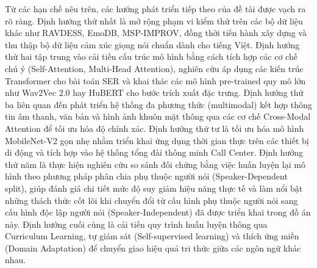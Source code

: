 Từ các hạn chế nêu trên, các hướng phát triển tiếp theo của đề tài được vạch ra rõ ràng. Định hướng thứ nhất là mở rộng phạm vi kiểm thử trên các bộ dữ liệu khác như RAVDESS, EmoDB, MSP-IMPROV, đồng thời tiến hành xây dựng và thu thập bộ dữ liệu cảm xúc giọng nói chuẩn dành cho tiếng Việt. Định hướng thứ hai tập trung vào cải tiến cấu trúc mô hình bằng cách tích hợp các cơ chế chú ý (Self-Attention, Multi-Head Attention), nghiên cứu áp dụng các kiến trúc Transformer cho bài toán SER và khai thác các mô hình pre-trained quy mô lớn như Wav2Vec 2.0 hay HuBERT cho bước trích xuất đặc trưng. Định hướng thứ ba liên quan đến phát triển hệ thống đa phương thức (multimodal) kết hợp thông tin âm thanh, văn bản và hình ảnh khuôn mặt thông qua các cơ chế Cross-Modal Attention để tối ưu hóa độ chính xác. Định hướng thứ tư là tối ưu hóa mô hình MobileNet-V2 gọn nhẹ nhằm triển khai ứng dụng thời gian thực trên các thiết bị di động và tích hợp vào hệ thống tổng đài thông minh Call Center. Định hướng thứ năm là thực hiện nghiên cứu so sánh đối chứng bằng việc huấn luyện lại mô hình theo phương pháp phân chia phụ thuộc người nói (Speaker-Dependent split), giúp đánh giá chi tiết mức độ suy giảm hiệu năng thực tế và làm nổi bật những thách thức cốt lõi khi chuyển đổi từ cấu hình phụ thuộc người nói sang cấu hình độc lập người nói (Speaker-Independent) đã được triển khai trong đồ án này. Định hướng cuối cùng là cải tiến quy trình huấn luyện thông qua Curriculum Learning, tự giám sát (Self-supervised learning) và thích ứng miền (Domain Adaptation) để chuyển giao hiệu quả tri thức giữa các ngôn ngữ khác nhau.
